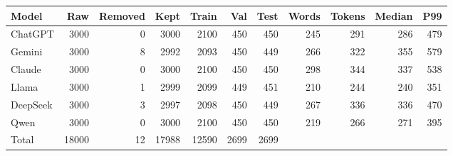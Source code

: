 \begin{tabular}{lrrrrrrrrrr}
\toprule
Model & Raw & Removed & Kept & Train & Val & Test & Words & Tokens & Median & P99 \\
\midrule
ChatGPT & 3000 & 0 & 3000 & 2100 & 450 & 450 & 245 & 291 & 286 & 479 \\
Gemini & 3000 & 8 & 2992 & 2093 & 450 & 449 & 266 & 322 & 355 & 579 \\
Claude & 3000 & 0 & 3000 & 2100 & 450 & 450 & 298 & 344 & 337 & 538 \\
Llama & 3000 & 1 & 2999 & 2099 & 449 & 451 & 210 & 244 & 240 & 351 \\
DeepSeek & 3000 & 3 & 2997 & 2098 & 450 & 449 & 267 & 336 & 336 & 470 \\
Qwen & 3000 & 0 & 3000 & 2100 & 450 & 450 & 219 & 266 & 271 & 395 \\
\midrule
Total & 18000 & 12 & 17988 & 12590 & 2699 & 2699 &  &  &  &  \\
\bottomrule
\end{tabular}
